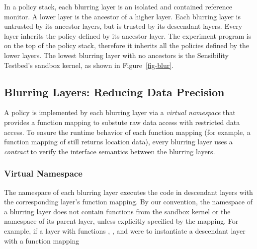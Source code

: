 In a policy stack, each blurring layer is an isolated and contained reference 
monitor. A lower layer is the ancestor of 
a higher layer. Each blurring layer is untrusted by its ancestor layers, 
but is trusted by its descendant layers. Every layer inherits the policy 
defined by its ancestor layer. The experiment program is on the top 
of the policy stack, therefore it inherits all the policies defined by the
lower layers. The lowest blurring layer with no ancestors is the 
Sensibility Testbed's sandbox kernel, as shown in Figure~\ref{fig-blur}. 


\subsection{Blurring Layers: Reducing Data Precision}\label{sec-layer}



A policy is implemented by each blurring layer via a \textit{virtual 
namespace} that provides a function mapping to substute raw 
data access with restricted data access. 
To ensure the runtime behavior of each function mapping (for example, 
a function mapping of  still returns location data), 
every blurring layer uses a \textit{contract} to verify the interface 
semantics between the blurring layers.

\subsubsection{Virtual Namespace}

The namespace of each blurring layer executes the code in descendant 
layers with the corresponding layer's function mapping. By our convention, 
the namespace of a blurring layer does not contain functions from the 
sandbox kernel or the namespace of its parent layer, unless explicitly 
specified by the mapping. For example, if a layer  with 
functions , , and 
 were to instantiate a descendant 
layer  with a function mapping 

